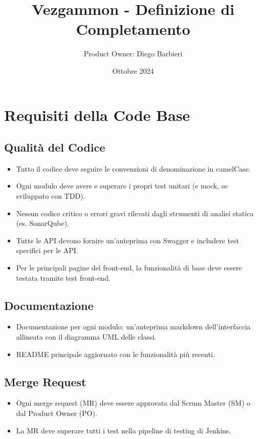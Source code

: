 \documentclass{article}
\title{Vezgammon - Definizione di Completamento}
\author{Product Owner: Diego Barbieri}
\date{Ottobre 2024}
\begin{document}
\maketitle

\section{Requisiti della Code Base}

\subsection{Qualità del Codice}
\begin{itemize}
    \item Tutto il codice deve seguire le convenzioni di denominazione in camelCase.
    \item Ogni modulo deve avere e superare i propri test unitari (e mock, se sviluppato con TDD).
    \item Nessun codice critico o errori gravi rilevati dagli strumenti di analisi statica (es. SonarQube).
    \item Tutte le API devono fornire un'anteprima con Swagger e includere test specifici per le API.
    \item Per le principali pagine del front-end, la funzionalità di base deve essere testata tramite test front-end.
\end{itemize}

\subsection{Documentazione}
\begin{itemize}
    \item Documentazione per ogni modulo: un'anteprima markdown dell'interfaccia allineata con il diagramma UML delle classi.
    \item README principale aggiornato con le funzionalità più recenti.
\end{itemize}

\subsection{Merge Request}
\begin{itemize}
    \item Ogni merge request (MR) deve essere approvata dal Scrum Master (SM) o dal Product Owner (PO).
    \item La MR deve superare tutti i test nella pipeline di testing di Jenkins.
\end{itemize}
\end{document}
